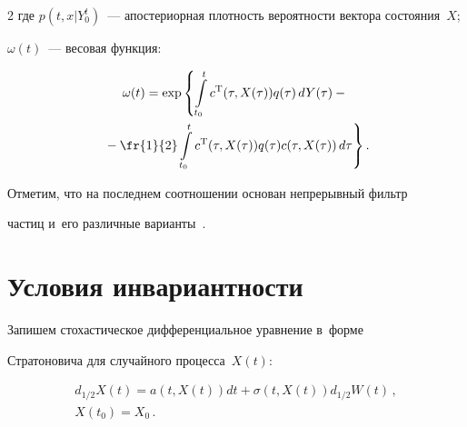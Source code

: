 \begin{multicols}{2}
где $p(t,x|Y_0^t)$~--- апостериорная плот\-ность ве\-ро\-ят\-ности вектора состояния~$X$; 

$\omega(t)$~--- весовая функция:



\vspace*{-4pt}



\noindent

\begin{multline*}

  \omega(t) = \exp \left\{ \int\limits_{t_0}^t c^\trans(\tau,X(\tau)) 

  q(\tau) \,dY(\tau) -{}\right.\\

\left.  {}- \fr{1}{2} \int\limits_{t_0}^t c^\trans(\tau,X(\tau)) 

  q(\tau) c(\tau,X(\tau)) \,d\tau \right\}.

\end{multline*}



Отметим, что на последнем соотношении основан непрерывный фильтр 

частиц и~его различные варианты~\cite{BaiCri_09, Ryb_17}.



\vspace*{-4pt}



\section{Условия инвариантности}



Запишем стохастическое дифференциальное уравнение в~форме 

Стратоновича для случайного процесса~$X(t)$:



\vspace*{-2pt}



\noindent

\begin{multline}

\label{eqStr}

  d_{1/2} X(t) = a \left( t,X(t) \right) dt + \sigma \left( t,X(t) \right) 

  d_{1/2} W(t)\,,\\ 

   X\left(t_0\right) = X_0\,.


\end{multline}
\end{multicols}
